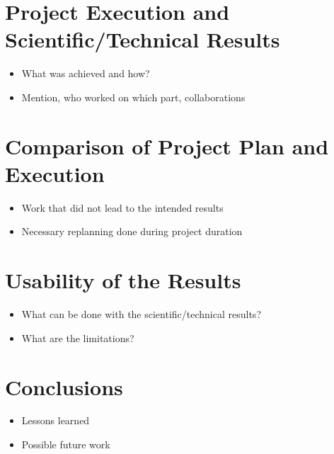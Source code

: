 \documentclass[cover]{ams-project}
\begin{document}
\section{Project Execution and Scientific/Technical Results}
\begin{itemize}
	\item What was achieved and how?
	\item Mention, who worked on which part, collaborations
\end{itemize}


\section{Comparison of Project Plan and Execution}
\begin{itemize}
	\item Work that did not lead to the intended results
	\item Necessary replanning done during project duration
\end{itemize}


\section{Usability of the Results}
\begin{itemize}
	\item What can be done with the scientific/technical results?
	\item What are the limitations?
\end{itemize}


\section{Conclusions}
\begin{itemize}
	\item Lessons learned
	\item Possible future work
\end{itemize}



\end{document}
